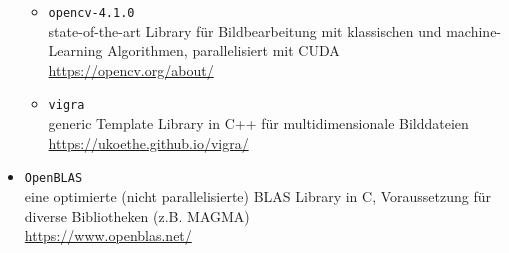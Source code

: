 \documentclass[headsepline=3pt,headinclude=true,12pt,oneside]{scrartcl}
\let\li=\lstinline
\begin{document}
\begin{itemize}
\begin{itemize}
			\item \li`opencv-4.1.0` \\
			state-of-the-art Library für Bildbearbeitung mit klassischen und machine-Learning Algorithmen, parallelisiert mit CUDA \\
			\url{https://opencv.org/about/}
			
			\item \li`vigra` \\
			generic Template Library in C++ für multidimensionale Bilddateien \\
			\url{https://ukoethe.github.io/vigra/}
		\end{itemize}  
		 
		\item \li`OpenBLAS` \\
		eine optimierte (nicht parallelisierte) BLAS Library in C, Voraussetzung für diverse Bibliotheken (z.B. MAGMA) \\
		\url{https://www.openblas.net/}
	\end{itemize}						
\end{document}
